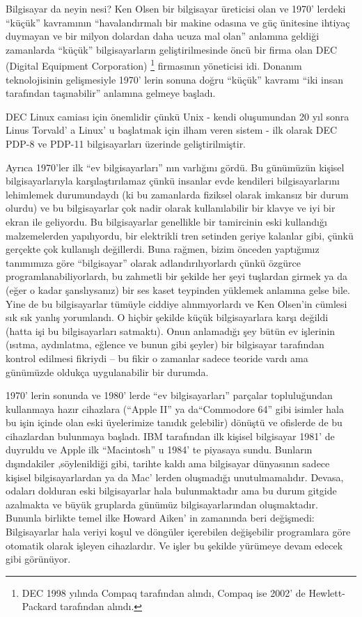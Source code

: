 \documentclass[10pt,a5paper]{book}
\begin{document}
\begin{section}{Bilgisayar da neyin nesi?}
Ken Olsen bir bilgisayar üreticisi olan ve 1970' lerdeki “küçük” kavramının “havalandırmalı bir makine odasına ve güç ünitesine ihtiyaç duymayan ve bir milyon dolardan daha ucuza mal olan” anlamına geldiği zamanlarda “küçük” bilgisayarların geliştirilmesinde öncü bir firma olan  DEC (Digital Equipment Corporation) \footnote{DEC 1998 yılında Compaq tarafından alındı, Compaq ise 2002' de Hewlett-Packard tarafından alındı.} firmasının yöneticisi idi. Donanım teknolojisinin gelişmesiyle 1970' lerin sonuna doğru “küçük” kavramı “iki insan tarafından taşınabilir” anlamına gelmeye başladı.

DEC Linux camiası için önemlidir çünkü Unix - kendi oluşumundan 20 yıl sonra Linus Torvald' a Linux' u başlatmak için ilham veren sistem - ilk olarak DEC PDP-8 ve PDP-11 bilgisayarları üzerinde geliştirilmiştir.

Ayrıca 1970'ler ilk “ev bilgisayarları” nın varlığını gördü. Bu günümüzün kişisel bilgisayarlarıyla karşılaştırılamaz çünkü insanlar evde kendileri bilgisayarlarını lehimlemek durumundaydı (ki bu zamanlarda fiziksel olarak imkansız bir durum olurdu) ve bu bilgisayarlar çok nadir olarak kullanılabilir bir klavye ve iyi bir ekran ile geliyordu. Bu bilgisayarlar genellikle bir tamircinin eski kullandığı malzemelerden yapılıyordu, bir elektrikli tren setinden geriye kalanlar gibi, çünkü gerçekte çok kullanışlı değillerdi. Buna rağmen, bizim önceden yaptığımız tanımımıza göre “bilgisayar” olarak adlandırılıyorlardı çünkü özgürce programlanabiliyorlardı, bu zahmetli bir şekilde her şeyi tuşlardan girmek ya da (eğer o kadar şanslıysanız) bir ses kaset teypinden yüklemek anlamına gelse bile. Yine de bu bilgisayarlar tümüyle ciddiye alınmıyorlardı ve Ken Olsen'in cümlesi sık sık yanlış yorumlandı. O hiçbir şekilde küçük bilgisayarlara karşı değildi (hatta işi bu bilgisayarları satmaktı). Onun anlamadığı şey bütün ev işlerinin (ısıtma, aydınlatma, eğlence ve bunun gibi şeyler) bir bilgisayar tarafından kontrol edilmesi fikriydi – bu fikir o zamanlar sadece teoride vardı ama günümüzde oldukça uygulanabilir bir durumda.

1970' lerin sonunda ve 1980' lerde “ev bilgisayarları” parçalar topluluğundan kullanmaya hazır  cihazlara (“Apple II” ya da“Commodore 64” gibi isimler hala bu işin içinde olan eski üyelerimize tanıdık gelebilir) dönüştü ve ofislerde de bu cihazlardan bulunmaya başladı. IBM tarafından ilk kişisel bilgisayar 1981' de duyruldu ve Apple ilk “Macintosh” u 1984' te piyasaya sundu. Bunların dışındakiler ,söylenildiği gibi, tarihte kaldı ama bilgisayar dünyasının sadece kişisel bilgisayarlardan ya da Mac' lerden oluşmadığı unutulmamalıdır.  Devasa, odaları dolduran eski bilgisayarlar hala bulunmaktadır ama bu durum gitgide azalmakta ve büyük gruplarda günümüz bilgisayarlarından oluşmaktadır. Bununla birlikte temel ilke Howard Aiken' in zamanında beri değişmedi: Bilgisayarlar hala veriyi koşul ve döngüler içerebilen değişebilir programlara göre otomatik olarak işleyen cihazlardır. Ve işler bu şekilde yürümeye devam edecek gibi görünüyor.

\end{section}
\end{document}
